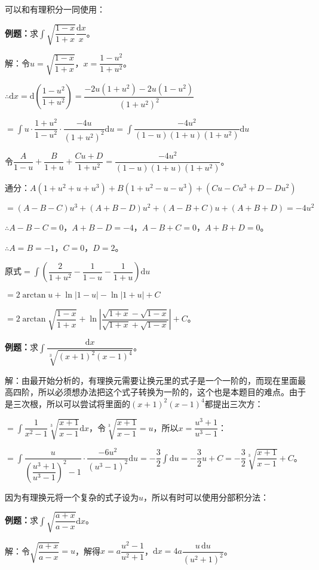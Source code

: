 \documentclass[UTF8, 12pt]{ctexart}
\begin{document}
可以和有理积分一同使用：\medskip

\textbf{例题：}求$\displaystyle{\int\sqrt{\dfrac{1-x}{1+x}}\dfrac{\textrm{d}x}{x}}$。\medskip

解：令$u=\sqrt{\dfrac{1-x}{1+x}}$，$x=\dfrac{1-u^2}{1+u^2}$。

$\therefore\textrm{d}x=\textrm{d}\left(\dfrac{1-u^2}{1+u^2}\right)=\dfrac{-2u(1+u^2)-2u(1-u^2)}{(1+u^2)^2}$

$=\displaystyle{\int u\cdot\dfrac{1+u^2}{1-u^2}\cdot\dfrac{-4u}{(1+u^2)^2}\textrm{d}u=\int\dfrac{-4u^2}{(1-u)(1+u)(1+u^2)}\textrm{d}u}$

令$\dfrac{A}{1-u}+\dfrac{B}{1+u}+\dfrac{Cu+D}{1+u^2}=\dfrac{-4u^2}{(1-u)(1+u)(1+u^2)}$。

通分：$A(1+u^2+u+u^3)+B(1+u^2-u-u^3)+(Cu-Cu^3+D-Du^2)$

$=(A-B-C)u^3+(A+B-D)u^2+(A-B+C)u+(A+B+D)=-4u^2$

$\therefore A-B-C=0$，$A+B-D=-4$，$A-B+C=0$，$A+B+D=0$。

$\therefore A=B=-1$，$C=0$，$D=2$。

原式$=\displaystyle{\int\left(\dfrac{2}{1+u^2}-\dfrac{1}{1-u}-\dfrac{1}{1+u}\right)\textrm{d}u}$

$=2\arctan u+\ln\vert1-u\vert-\ln\vert1+u\vert+C$

$=2\arctan\sqrt{\dfrac{1-x}{1+x}}+\ln\left\vert\dfrac{\sqrt{1+x}-\sqrt{1-x}}{\sqrt{1+x}+\sqrt{1-x}}\right\vert+C$。

\textbf{例题：}求$\displaystyle{\int\dfrac{\textrm{d}x}{\sqrt[3]{(x+1)^2(x-1)^4}}}$。

解：由最开始分析的，有理换元需要让换元里的式子是一个一阶的，而现在里面最高四阶，所以必须想办法把这个式子转换为一阶的，这个也是本题目的难点。由于是三次根，所以可以尝试将里面的$(x+1)^2(x-1)^4$都提出三次方：

$=\displaystyle{\int\dfrac{1}{x^2-1}\sqrt[3]{\dfrac{x+1}{x-1}}\textrm{d}x}$，令$\sqrt[3]{\dfrac{x+1}{x-1}}=u$，所以$x=\dfrac{u^3+1}{u^3-1}$：

$=\displaystyle{\int\dfrac{u}{\left(\dfrac{u^3+1}{u^3-1}\right)^2-1}\cdot\dfrac{-6u^2}{(u^3-1)^2}\textrm{d}u=-\dfrac{3}{2}\int\textrm{d}u}=-\dfrac{3}{2}u+C=-\dfrac{3}{2}\sqrt[3]{\dfrac{x+1}{x-1}}+C $。

因为有理换元将一个复杂的式子设为$u$，所以有时可以使用分部积分法：\medskip

\textbf{例题：}求$\displaystyle{\int\sqrt{\dfrac{a+x}{a-x}}\textrm{d}x}$。\medskip

解：令$\sqrt{\dfrac{a+x}{a-x}}=u$，解得$x=a\dfrac{u^2-1}{u^2+1}$，$\textrm{d}x=4a\dfrac{u\,\textrm{d}u}{(u^2+1)^2}$。
\end{document}
